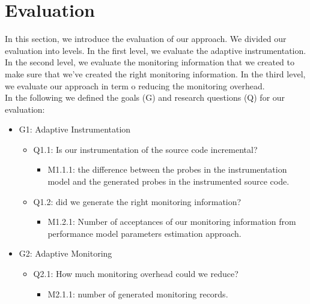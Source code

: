 
\chapter{Evaluation}
\label{ch:Evaluation}

In this section, we introduce the evaluation of our approach. We divided our evaluation into levels. In the first level, we evaluate the adaptive instrumentation. In the second level, we evaluate the monitoring information that we created to make sure that we’ve created the right monitoring information. In the third level, we evaluate our approach in term o reducing the monitoring overhead. \\
In the following we defined the goals (G) and research questions (Q) for our evaluation:

\begin{itemize}[label={}, leftmargin=*]
\item G1: Adaptive Instrumentation
  \begin{itemize}[label={}]
  \item Q1.1: Is our instrumentation of the source code incremental?
      \begin{itemize}[label={}]
      \item M1.1.1: the difference between the probes in the instrumentation model and the generated probes in the            
                    instrumented source code.  
      \end{itemize}
   \item Q1.2: did we generate the right monitoring information?
        \begin{itemize}[label={}]
             \item M1.2.1: Number of acceptances of our monitoring information from performance model parameters  
                           estimation approach.
      \end{itemize}
  \end{itemize}
\item G2: Adaptive Monitoring
   \begin{itemize}[label={}]
   \item Q2.1: How much monitoring overhead could we reduce?
       \begin{itemize}[label={}]
        \item M2.1.1: number of generated monitoring records. 
       \end{itemize}
   \end{itemize}
\end{itemize}



